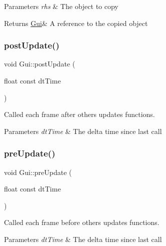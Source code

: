 \begin{DoxyParams}{Parameters}
{\em rhs} & The object to copy \\
\hline
\end{DoxyParams}
\begin{DoxyReturn}{Returns}
\hyperlink{class_gui}{Gui}\& A reference to the copied object 
\end{DoxyReturn}
\mbox{\label{class_gui_a0e365402acdc30d41e31a76124182ded}} 
\subsubsection{\texorpdfstring{post\+Update()}{postUpdate()}}
{\footnotesize\ttfamily void Gui\+::post\+Update (\begin{DoxyParamCaption}\item[{float const}]{dt\+Time }\end{DoxyParamCaption})}



Called each frame after others updates functions. 


\begin{DoxyParams}{Parameters}
{\em dt\+Time} & The delta time since last call \\
\hline
\end{DoxyParams}
\mbox{\label{class_gui_a8e51befeff5deda5a8d0283b1af7446e}} 
\subsubsection{\texorpdfstring{pre\+Update()}{preUpdate()}}
{\footnotesize\ttfamily void Gui\+::pre\+Update (\begin{DoxyParamCaption}\item[{float const}]{dt\+Time }\end{DoxyParamCaption})}



Called each frame before others updates functions. 


\begin{DoxyParams}{Parameters}
{\em dt\+Time} & The delta time since last call \\
\hline
\end{DoxyParams}
\mbox{\label{class_gui_a4066b5f349a7f94203bd0ac506a47571}} 
